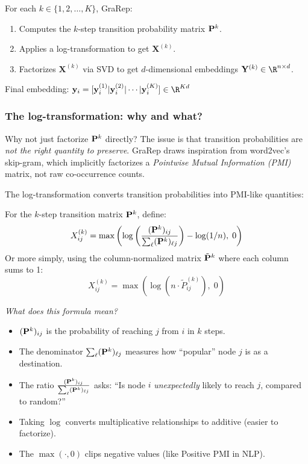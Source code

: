 \begin{notechapter}
\begin{definition}[GraRep]
For each $k \in \{1, 2, \ldots, K\}$, GraRep:
\begin{enumerate}
    \item Computes the $k$-step transition probability matrix $\mathbf{P}^k$.
    \item Applies a log-transformation to get $\mathbf{X}^{(k)}$.
    \item Factorizes $\mathbf{X}^{(k)}$ via SVD to get $d$-dimensional embeddings $\embed^{(k)} \in \R^{n \times d}$.
\end{enumerate}
Final embedding: $\vect{y}_i = [\vect{y}_i^{(1)} | \vect{y}_i^{(2)} | \cdots | \vect{y}_i^{(K)}] \in \R^{Kd}$
\end{definition}

\subsubsection*{The log-transformation: why and what?}

\begin{intuition}[Motivation]
Why not just factorize $\mathbf{P}^k$ directly? The issue is that transition probabilities are \emph{not the right quantity to preserve}. GraRep draws inspiration from word2vec's skip-gram, which implicitly factorizes a \emph{Pointwise Mutual Information (PMI)} matrix, not raw co-occurrence counts.
\end{intuition}

The log-transformation converts transition probabilities into PMI-like quantities:

\begin{definition}
For the $k$-step transition matrix $\mathbf{P}^k$, define:
\[
X^{(k)}_{ij} = \max\left( \log\left( \frac{(\mathbf{P}^k)_{ij}}{\sum_{\ell} (\mathbf{P}^k)_{\ell j}} \right) - \log(1/n), \; 0 \right)
\]
Or more simply, using the column-normalized matrix $\tilde{\mathbf{P}}^k$ where each column sums to 1:
\[
X^{(k)}_{ij} = \max\left( \log(n \cdot \tilde{P}^{(k)}_{ij}), \; 0 \right)
\]
\end{definition}

\begin{intuition}
\emph{What does this formula mean?}

\begin{itemize}
    \item $(\mathbf{P}^k)_{ij}$ is the probability of reaching $j$ from $i$ in $k$ steps.
    \item The denominator $\sum_{\ell} (\mathbf{P}^k)_{\ell j}$ measures how ``popular'' node $j$ is as a destination.
    \item The ratio $\frac{(\mathbf{P}^k)_{ij}}{\sum_{\ell} (\mathbf{P}^k)_{\ell j}}$ asks: ``Is node $i$ \emph{unexpectedly} likely to reach $j$, compared to random?''
    \item Taking $\log$ converts multiplicative relationships to additive (easier to factorize).
    \item The $\max(\cdot, 0)$ clips negative values (like Positive PMI in NLP).
\end{itemize}


\end{intuition}
\end{notechapter}

